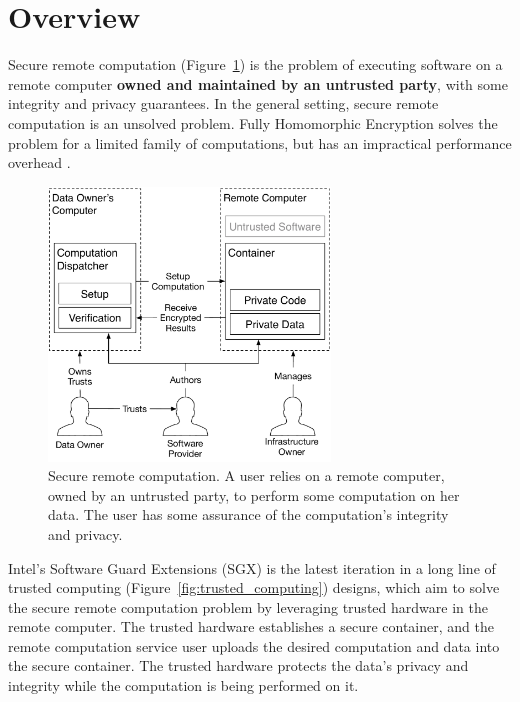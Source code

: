 \section{Overview}
\label{sec:intro}

Secure remote computation (Figure~\ref{fig:remote_computation}) is the problem
of executing software on a remote computer \textbf{owned and maintained by an
untrusted party}, with some integrity and privacy guarantees. In the general
setting, secure remote computation is an unsolved problem. Fully Homomorphic
Encryption \cite{gentry2009fhe} solves the problem for a limited family of
computations, but has an impractical performance overhead
\cite{naehrig2011can}.

\begin{figure}[hbt]
  \centering
  \includegraphics[width=75mm]{figures/remote_computation.pdf}
  \caption{
    Secure remote computation. A user relies on a remote computer, owned by an
    untrusted party, to perform some computation on her data. The user has some
    assurance of the computation's integrity and privacy.
  }
  \label{fig:remote_computation}
\end{figure}

Intel's Software Guard Extensions (SGX) is the latest iteration in a long line
of trusted computing (Figure~\ref{fig:trusted_computing}) designs, which aim to
solve the secure remote computation problem by leveraging trusted hardware in
the remote computer. The trusted hardware establishes a secure container, and
the remote computation service user uploads the desired computation and data
into the secure container. The trusted hardware protects the data's privacy
and integrity while the computation is being performed on it.

